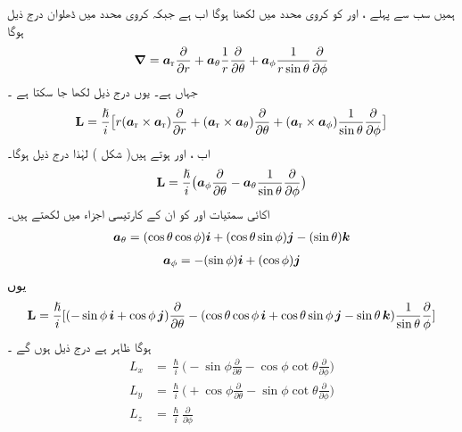 ہمیں سب سے پہلے ،   اور  کو کروی محدد میں لکھنا ہوگا اب   ہے جبکہ کروی محدد میں ڈھلوان درج ذیل ہوگا 
\begin{align}
{\ensuremath{{\boldsymbol{\nabla}}}} = {\boldsymbol{a}}_{\textup{r}} \frac{\partial}{\partial r} + {\boldsymbol{a}}_{\theta} \frac{1}{r} \frac{\partial}{\partial \theta} + {\boldsymbol{a}}_{\phi} \frac{1}{r \sin {\theta}} \frac{\partial}{\partial \phi}
\end{align}
جہاں  ہے۔ یوں درج ذیل لکھا جا سکتا ہے ۔
\begin{align*}
\operatorname{\mathbf{L}} = \frac{\hslash}{i} \big [ r ({\boldsymbol{a}}_{\textup{r}} \times {\boldsymbol{a}}_{\textup{r}}) \frac{\partial}{\partial r} + ({\boldsymbol{a}}_{\textup{r}} \times {\boldsymbol{a}}_{\theta}) \frac{\partial}{\partial \theta} + ({\boldsymbol{a}}_{\textup{r}} \times {\boldsymbol{a}}_{\phi}) \frac{1}{\sin \theta} \frac{\partial}{\partial \phi} \big ]
\end{align*}
اب ،   اور  ہوتے ہیں( شکل )   لہٰذا درج ذیل ہوگا۔ 
\begin{align}
\operatorname{\mathbf{L}} = \frac{\hslash}{i} \big ( {\boldsymbol{a}}_{\phi} \frac{\partial}{\partial \theta} - {\boldsymbol{a}}_{\theta} \frac{1}{\sin \theta} \frac{\partial}{\partial \phi} \big )
\end{align}
اکائی  سمتیات  اور  کو ان کے کارتیسی اجزاء میں لکھتے ہیں۔ 
\begin{align}
{\boldsymbol{a}}_{\theta} = (\cos \theta \cos \phi) {\boldsymbol{i}} + (\cos \theta \sin \phi) {\boldsymbol{j}} - (\sin \theta) {\boldsymbol{k}}
\end{align}
\begin{align}
{\boldsymbol{a}}_{\phi} = - (\sin \phi) {\boldsymbol{i}} + (\cos \phi) {\boldsymbol{j}}
\end{align}
یوں 
\begin{align*}
\operatorname{\mathbf{L}} = \frac{\hslash}{i} [(- \sin \phi \,{\boldsymbol{i}} + \cos \phi\, {\boldsymbol{j}}) \frac{\partial}{\partial \theta} - (\cos \theta \cos \phi \,{\boldsymbol{i}} + \cos \theta \sin \phi \,{\boldsymbol{j}} - \sin \theta \,{\boldsymbol{k}}) \frac{1}{\sin \theta} \frac{\partial}{\phi}]
\end{align*}
ہوگا ظاہر ہے درج ذیل ہوں گے ۔
\begin{align}
L_x &= \frac{\hslash}{i} \big ( - \sin \phi \frac{\partial}{\partial \theta} - \cos \phi \cot \theta \frac{\partial}{\partial \phi} \big )\\
L_y &= \frac{\hslash}{i} \big ( + \cos \phi \frac{\partial}{\partial \theta} - \sin \phi \cot \theta \frac{\partial}{\partial \phi} \big )\\
L_z &= \frac{\hslash}{i} \frac{\partial}{\partial \phi}\label{مساوات_تین_ابعادی_زیڈ_عامل}
\end{align} 

